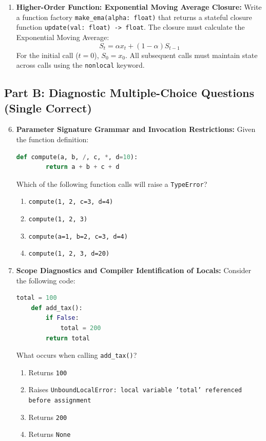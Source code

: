 \begin{enumerate}
    \item \textbf{Higher-Order Function: Exponential Moving Average Closure:}
    Write a function factory \texttt{make\_ema(alpha: float)} that returns a stateful closure function \texttt{update(val: float) -> float}.
    The closure must calculate the Exponential Moving Average:
    \begin{equation}
    S_t = \alpha x_t + (1 - \alpha) S_{t-1}
    \end{equation}
    For the initial call ($t = 0$), $S_0 = x_0$. All subsequent calls must maintain state across calls using the \texttt{nonlocal} keyword.
\end{enumerate}

\subsection*{Part B: Diagnostic Multiple-Choice Questions (Single Correct)}

\begin{enumerate}
    \setcounter{enumi}{5}
    \item \textbf{Parameter Signature Grammar and Invocation Restrictions:}
    Given the function definition:
    \begin{lstlisting}[language=Python]
    def compute(a, b, /, c, *, d=10):
        return a + b + c + d
    \end{lstlisting}
    Which of the following function calls will raise a \texttt{TypeError}?
    \begin{enumerate}
        \item \texttt{compute(1, 2, c=3, d=4)}
        \item \texttt{compute(1, 2, 3)}
        \item \texttt{compute(a=1, b=2, c=3, d=4)}
        \item \texttt{compute(1, 2, 3, d=20)}
    \end{enumerate}

    \item \textbf{Scope Diagnostics and Compiler Identification of Locals:}
    Consider the following code:
    \begin{lstlisting}[language=Python]
    total = 100
    def add_tax():
        if False:
            total = 200
        return total
    \end{lstlisting}
    What occurs when calling \texttt{add\_tax()}?
    \begin{enumerate}
        \item Returns \texttt{100}
        \item Raises \texttt{UnboundLocalError: local variable 'total' referenced before assignment}
        \item Returns \texttt{200}
        \item Returns \texttt{None}
    \end{enumerate}
\end{enumerate}
